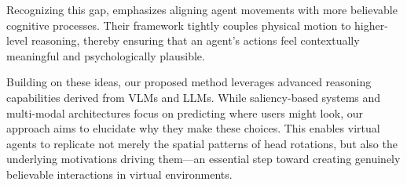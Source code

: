 Recognizing this gap, \cite{curtis2022toward} emphasizes aligning agent movements with more believable cognitive processes. Their framework tightly couples physical motion to higher-level reasoning, thereby ensuring that an agent’s actions feel contextually meaningful and psychologically plausible. 

Building on these ideas, our proposed method leverages advanced reasoning capabilities derived from VLMs and LLMs. While saliency-based systems and multi-modal architectures focus on predicting where users might look, our approach aims to elucidate why they make these choices. This enables virtual agents to replicate not merely the spatial patterns of head rotations, but also the underlying motivations driving them—an essential step toward creating genuinely believable interactions in virtual environments.